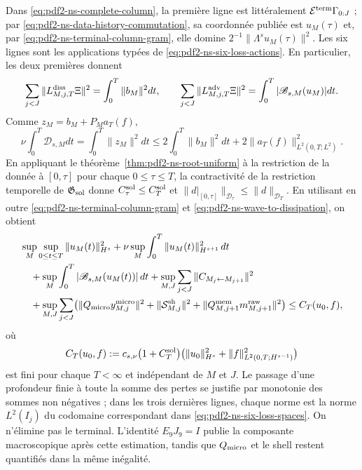 Dans \eqref{eq:pdf2-ns-complete-column}, la première ligne est littéralement
$\mathcal E^{\rm term}\Gamma_{0:J}$ ; par
\eqref{eq:pdf2-ns-data-history-commutation}, sa coordonnée publiée est
$u_M(\tau)$ et, par \eqref{eq:pdf2-ns-terminal-column-gram}, elle domine
$2^{-1}\|\Lambda^su_M(\tau)\|^2$. Les six lignes sont les applications typées de
\eqref{eq:pdf2-ns-six-loss-actions}. En particulier, les deux premières donnent
\[
 \sum_{j<J}\|L^{\rm diss}_{M,j,T}\Xi\|^2
 =\int_0^T\|b_M\|^2dt,
 \qquad
 \sum_{j<J}\|L^{\rm adv}_{M,j,T}\Xi\|^2
 =\int_0^T|\mathscr B_{s,M}(u_M)|dt.
\]
Comme $z_M=b_M+P_Ma_T(f)$,
\begin{equation}\label{eq:pdf2-ns-wave-to-dissipation}
 \nu\int_0^T \mathscr D_{s,M}dt
 =\int_0^T\|z_M\|^2dt
 \leq2\int_0^T\|b_M\|^2dt+2\|a_T(f)\|_{L^2(0,T;L^2)}^2.
\end{equation}
En appliquant le théorème~\ref{thm:pdf2-ns-root-uniform} à la restriction de la donnée à
$[0,\tau]$ pour chaque $0\le\tau\le T$, la contractivité de la restriction
temporelle de $\mathfrak G_{\rm sol}$ donne
$C_\tau^{\rm sol}\le C_T^{\rm sol}$ et
$\|d|_{[0,\tau]}\|_{\mathcal D_\tau}\le\|d\|_{\mathcal D_T}$. En utilisant en outre
\eqref{eq:pdf2-ns-terminal-column-gram} et
\eqref{eq:pdf2-ns-wave-to-dissipation}, on obtient
\begin{equation}\label{eq:pdf2-ns-cota-requerida}
 \begin{aligned}
 &\sup_M\sup_{0\le t\le T}\|u_M(t)\|_{H^s}^2
 +\nu\sup_M\int_0^T\|u_M(t)\|_{H^{s+1}}^2\,dt\\
 &\quad
 +\sup_M\int_0^T|\mathscr B_{s,M}(u_M(t))|\,dt
 +\sup_{M,J}\sum_{j<J}\|C_{M_j\leftarrow M_{j+1}}\|^2\\
 &\quad
 +\sup_{M,J}\sum_{j<J}
   \bigl(\|Q_{\rm micro}y^{\rm micro}_{M,j}\|^2
          +\|\mathcal S_{M,j}^{\rm sh}\|^2
          +\|Q^{\rm mem}_{M,j+1}m^{\rm raw}_{M,j+1}\|^2\bigr)
 \le C_T(u_0,f),
 \end{aligned}
\end{equation}
où
\[
 C_T(u_0,f):=c_{s,\nu}\bigl(1+C_T^{\rm sol}\bigr)
 \bigl(\|u_0\|_{H^s}^2+
       \|f\|_{L^2(0,T;H^{s-1})}^2\bigr)
\]
est fini pour chaque $T<\infty$ et indépendant de $M$ et $J$. Le passage d'une
profondeur finie à toute la somme des pertes se justifie par monotonie des sommes non
négatives ; dans les trois dernières lignes, chaque norme est la norme $L^2(I_j)$ du
codomaine correspondant dans \eqref{eq:pdf2-ns-six-loss-spaces}. On n'élimine pas
le terminal. L'identité
$E_9J_9=I$ publie la composante macroscopique après cette estimation, tandis que
$Q_{\rm micro}$ et le shell restent quantifiés dans la même inégalité.

